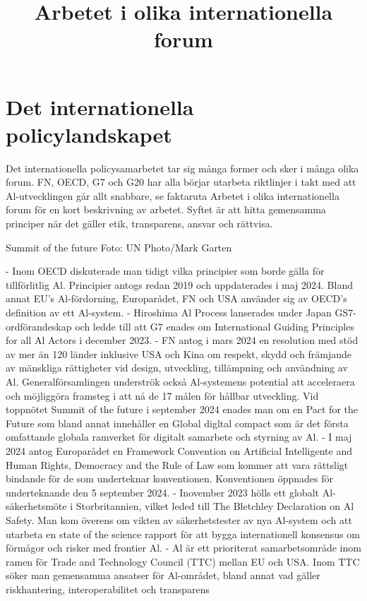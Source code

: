 {{{{{{{{{{{{{{{\section*{Det internationella policylandskapet}
Det internationella policysamarbetet tar sig många former och sker i många olika forum. FN, OECD, G7 och G20 har alla börjar utarbeta riktlinjer i takt med att
Al-utvecklingen går allt snabbare, se faktaruta Arbetet i olika internationella forum för en kort beskrivning av arbetet. Syftet är att hitta gemensamma principer när det gäller etik, transparens, ansvar och rättvisa.

Summit of the future Foto: UN Photo/Mark Garten

\title{
Arbetet i olika internationella forum
}
- Inom OECD diskuterade man tidigt vilka principier som borde gälla för tillförlitlig Al. Principier antogs redan 2019 och uppdaterades i maj 2024. Bland annat EU's Al-fördorning, Europarådet, FN och USA använder sig av OECD's definition av ett Al-system.
- Hiroshima Al Process lanserades under Japan GS7-ordförandeskap och ledde till att G7 enades om International Guiding Principles for all Al Actors i december 2023.
- FN antog i mars 2024 en resolution med stöd av mer än 120 länder inklusive USA och Kina om respekt, skydd och främjande av mänskliga rättigheter vid design, utveckling, tillämpning och användning av Al. Generalförsamlingen underströk också Al-systemens potential att acceleraera och möjliggöra framsteg i att nå de 17 målen för hållbar utveckling. Vid toppnötet Summit of the future i september 2024 enades man om en Pact for the Future som bland annat innehåller en Global digltal compact som är det första omfattande globala ramverket för digitalt samarbete och styrning av Al.
- I maj 2024 antog Europarådet en Framework Convention on Artificial Intelligente and Human Rights, Democracy and the Rule of Law som kommer att vara rättsligt bindande för de som underteknar konventionen. Konventionen öppnades för underteknande den 5 september 2024.
- Inovember 2023 hölls ett globalt Al-säkerhetsmöte i Storbritannien, vilket leded till The Bletchley Declaration on Al Safety. Man kom överens om vikten av säkerhetstester av nya Al-system och att utarbeta en state of the science rapport för att bygga internationell konsensus om förmågor och risker med frontier Al.
- Al är ett prioriterat samarbetsområde inom ramen för Trade and Technology Council (TTC) mellan EU och USA. Inom TTC söker man gemensamma ansatser för Al-området, bland annat vad gäller riskhantering, interoperabilitet och transparens
}}}}}}}}}}}}}}}

